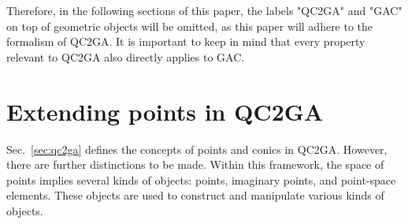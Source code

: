 \documentclass{birkjour}
\begin{document}
Therefore, in the following sections of this paper, the labels "QC2GA" and "GAC" on top of geometric objects will be omitted, as this paper will adhere to the formalism of QC2GA. It is important to keep in mind that every property relevant to QC2GA also directly applies to GAC.


\section{Extending points in QC2GA}
\label{sec:points}

Sec.~\ref{sec:qc2ga} defines the concepts of points and conics in QC2GA. 
However, there are further distinctions to be made. Within this framework, the space of points implies several kinds of objects: points, imaginary points, and point-space elements. These objects are used to construct and manipulate various kinds of objects.
\end{document}
